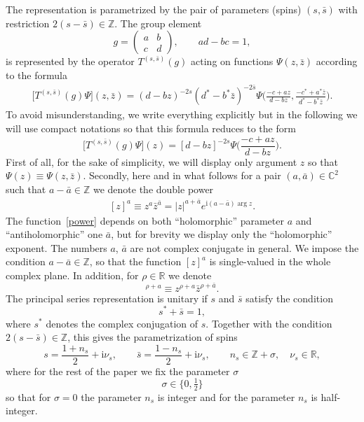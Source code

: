 \documentclass[pdftex]{sigma}
\renewcommand{\imath}{\mathrm{i}}
\numberwithin{equation}{section}
\begin{document}
The representation is parametrized by the pair of parameters (spins) $(s, \bar{s})$ with restriction $2(s - \bar{s}) \in \mathbb{Z}$.
The group element
\begin{equation*}
	g =
	\begin{pmatrix}
		a & b \\
		c & d
	\end{pmatrix}, \qquad ad - bc = 1,
\end{equation*}
is represented by the operator $T^{(s,\bar{s})}(g)$ acting on functions $\Psi(z ,\bar{z})$ according to the formula
\begin{align*}
	\bigl[T^{(s,\bar{s})}(g) \Psi\bigr] (z ,\bar{z}) =
	(d-bz)^{-2s} (d^*-b^*\bar{z})^{-2\bar{s}}
\Psi \biggl(\frac{-c+az}{d-bz} ,\frac{-c^*+a^* \bar{z}}{d^*-b^*\bar{z}}\biggr).
\end{align*}
To avoid misunderstanding, we write everything explicitly but in the following
we will use compact notations so that this formula reduces to the form
\begin{equation*}
	\bigl[T^{(s,\bar{s})}(g) \Psi\bigr] (z) =
	[d-bz]^{-2s} \Psi \biggl(\frac{-c+az}{d-bz}\biggr).
\end{equation*}
First of all, for the sake of simplicity, we will display only argument $z$
so that~\mbox{$\Psi(z) \equiv \Psi(z, \bar{z})$}.
Secondly, here and in what follows for a pair $(a,\bar{a}) \in \mathbb{C}^2$ such that $a-\bar{a} \in \mathbb{Z}$ we denote the double power
\begin{align} \label{power}
	[z]^a \equiv z^a \bar{z}^{\bar{a}} = |z|^{a+\bar{a}} {e}^{\imath(a-\bar{a}) \arg z}.
\end{align}
The function~\eqref{power} depends on both ``holomorphic'' parameter $a$ and ``antiholomorphic'' one $\bar{a}$, but for brevity we display only the ``holomorphic'' exponent. The numbers $a$, $\bar{a}$ are not complex conjugate in general. We impose the condition $a-\bar{a} \in \mathbb{Z}$, so that the function $[z]^a$ is single-valued in the whole complex plane. In addition, for $\rho \in \mathbb{R}$ we denote
\begin{equation*}
	[z]^{\rho+a} \equiv z^{\rho+a} \bar{z}^{\rho+\bar{a}} .
\end{equation*}
The principal series representation is unitary if $s$ and $\bar{s}$ satisfy the condition
\begin{equation} \label{scond}
	s^\ast + \bar{s} = 1 ,
\end{equation}
where $s^\ast$ denotes the complex conjugation of $s$. Together with the condition $2(s - \bar{s}) \in \mathbb{Z}$, this gives the parametrization of spins
\begin{equation}\label{sparam}
	s = \frac{1+n_s}{2} + \imath\nu_s, \qquad
	\bar{s} = \frac{1-n_s}{2} + \imath\nu_s ,
	\qquad
	n_s \in \mathbb{Z}+\sigma, \quad \nu_s \in \mathbb{R},
\end{equation}
where for the rest of the paper we fix the parameter $\sigma$
\begin{equation} \label{sigma}
	\sigma \in \bigl\{0, \tfrac{1}{2}\bigr\}
\end{equation}
so that for $\sigma=0$ the parameter $n_s$ is integer and for
 the parameter $n_s$ is half-integer.
\end{document}
